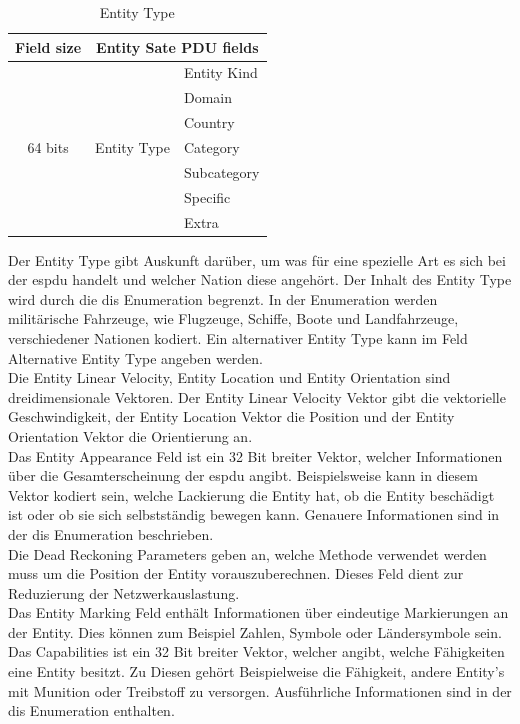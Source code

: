 \begin{table}[H]
	\centering
	\begin{tabular}{|c|c|l|}
		\hline
		Field size               & \multicolumn{2}{c|}{Entity Sate PDU fields} \\ \hline
		\multirow{7}{*}{64 bits} & \multirow{7}{*}{Entity Type}  & Entity Kind \\ \cline{3-3} 
		&                               & Domain      \\ \cline{3-3} 
		&                               & Country     \\ \cline{3-3} 
		&                               & Category    \\ \cline{3-3} 
		&                               & Subcategory \\ \cline{3-3} 
		&                               & Specific    \\ \cline{3-3} 
		&                               & Extra       \\ \hline
	\end{tabular}
\caption[Entity Type ]{Entity Type\cite{SISOStandardsActivityCommitteeoftheIEEEComputerSociety.}}
\label{type}

\end{table}
Der Entity Type gibt Auskunft darüber, um was für eine spezielle Art es sich bei der \ac{espdu} handelt und welcher Nation diese angehört. Der Inhalt des Entity Type wird durch die \ac{dis} Enumeration begrenzt. In der Enumeration werden militärische Fahrzeuge, wie Flugzeuge, Schiffe, Boote und Landfahrzeuge, verschiedener Nationen kodiert. Ein alternativer Entity Type kann im Feld \glqq Alternative Entity Type\grqq{} angeben werden.\\
Die  \glqq Entity Linear Velocity\grqq{}, \glqq Entity Location\grqq{} und \glqq Entity Orientation\grqq{} sind  dreidimensionale Vektoren. Der  \glqq Entity Linear Velocity\grqq{} Vektor gibt die vektorielle Geschwindigkeit, der \glqq Entity Location\grqq{} Vektor die Position und der \glqq Entity Orientation\grqq{} Vektor die Orientierung an. \\
Das  \glqq Entity Appearance\grqq{} Feld ist ein 32 Bit breiter Vektor, welcher Informationen über die Gesamterscheinung der \ac{espdu} angibt. Beispielsweise kann in diesem Vektor kodiert sein, welche Lackierung die Entity hat, ob die Entity beschädigt ist oder ob sie sich selbstständig bewegen kann. Genauere Informationen sind in der \ac{dis} Enumeration beschrieben.\\
 Die  \glqq Dead Reckoning Parameters\grqq{}  geben an, welche Methode verwendet werden muss um die Position der Entity vorauszuberechnen. Dieses Feld dient zur Reduzierung der Netzwerkauslastung.\\
 Das \glqq Entity Marking\grqq{} Feld enthält Informationen über eindeutige Markierungen an der Entity. Dies können zum Beispiel Zahlen, Symbole oder Ländersymbole sein.\\ Das \glqq Capabilities\grqq{} ist ein 32 Bit breiter Vektor, welcher angibt, welche Fähigkeiten eine Entity besitzt. Zu Diesen  gehört Beispielweise die 
Fähigkeit, andere Entity's mit Munition oder Treibstoff zu versorgen. Ausführliche Informationen sind in der \ac{dis} Enumeration enthalten.

